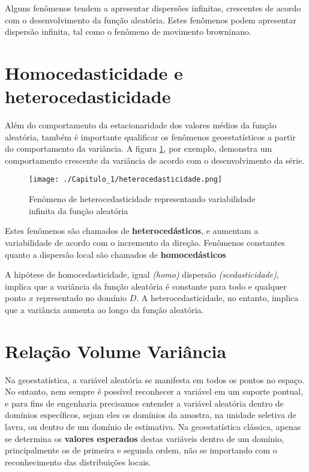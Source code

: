 Alguns fenômenos tendem a apresentar dispersões infinitas, crescentes de acordo com o desenvolvimento da função aleatória. Estes fenômenos podem apresentar dispersão infinita, tal como o fenômeno de movimento browninano. 

\section{Homocedasticidade e heterocedasticidade}

Além do comportamento da estacionaridade dos valores médios da função aleatória, também é importante qualificar os fenômenos geoestatísticos a partir do comportamento da variância. A figura \ref{etero}, por exemplo, demonstra um comportamento crescente da variância de acordo com o desenvolvimento da série.

\FloatBarrier
\begin{figure}[!htb]
	\centering
	\texttt{[image: ./Capitulo\_1/heterocedasticidade.png]}	
	\caption{Fenômeno de heterocedasticidade representando variabilidade infinita da função aleatória } 
	\label{etero}
\end{figure}
\FloatBarrier

 Estes fenômenos são chamados de \textbf{heterocedásticos}, e aumentam a variabilidade de acordo com o incremento da direção. Fenômenos constantes quanto a dispersão local são chamados de \textbf{homocedásticos}

\begin{definition}[homocedasticidade]
	A hipótese de homocedasticidade,  igual \textit{(homo)} dispersão \textit{(scedasticidade)}, implica que a variância da função aleatória é constante para todo e qualquer ponto $x$ representado no domínio $D$. A heterocedasticidade, no entanto, implica que a variância aumenta ao longo da função aleatória.
\end{definition}

\section{Relação Volume Variância}

Na geoestatística, a variável aleatória se manifesta em todos os pontos no espaço. No entanto, nem sempre é possível reconhecer a variável em um suporte pontual, e para fins de engenharia precisamos entender a variável aleatória dentro de domínios específicos, sejam eles os domínios da amostra, na unidade seletiva de lavra, ou dentro de um domínio de estimativa. Na geoestatística clássica, apenas se determina os \textbf{valores esperados} destas variáveis dentro de um domínio, principalmente os de primeira e segunda ordem, não se importando com o reconhecimento das distribuições locais. 

